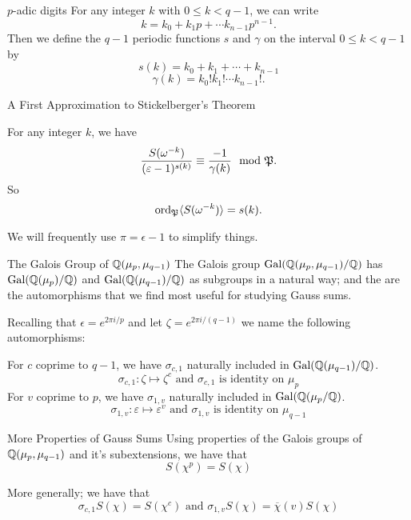 \documentclass[presentation]{beamer}
\begin{document}
\begin{frame}{$p$-adic digits}
For any integer $k$ with $0 \leq k < q-1$, we can write \[k = k_0 + k_1 p + \cdots k_{n-1} p^{n-1}.\]
\pause
\vspace{0.5cm}
Then we define the $q-1$ periodic functions $s$ and $\gamma$ on the interval $0 \leq k < q-1$ by
\[s(k) = k_0 + k_1 + \cdots +k_{n-1} \]
\[\gamma(k) = k_0! k_1! \cdots k_{n-1}!.\]
\end{frame}

\begin{frame}{A First Approximation to Stickelberger's Theorem}
\begin{theorem}
For any integer $k$, we have \[\frac{S(\omega^{-k})}{(\varepsilon - 1)^{s(k)}} \equiv \frac{-1}{\gamma(k)} \mod {\mathfrak{P}}.\]
So \[\textrm{ord}_{\mathfrak{P}} \langle S(\omega^{-k} ) \rangle= s(k).\]
\end{theorem}

We will frequently use $\pi = \epsilon - 1$ to simplify things.
\end{frame}

\begin{frame}{The Galois Group of $\mathbb{Q}(\mu_p, \mu_{q-1})$}
The Galois group $\textrm{Gal}(\mathbb{Q}(\mu_p, \mu_{q-1})/\mathbb{Q})$ has $\textrm{Gal}(\mathbb{Q}(\mu_p)/\mathbb{Q})$ and $\textrm{Gal}(\mathbb{Q}(\mu_{q-1})/\mathbb{Q})$ as subgroups in a natural way; and the are the automorphisms that we find most useful for studying Gauss sums. 

Recalling that $\epsilon = e^{2 \pi i /p}$ and let $\zeta = e^{2 \pi i/ (q-1)}$ we name the following automorphisms:\\
\pause
\vspace{0.5cm}

For $c$ coprime to $q-1$, we have $\sigma_{c,1}$ naturally included in $\textrm{Gal}(\mathbb{Q}(\mu_{q-1})/\mathbb{Q})$.
\[\sigma_{c,1} : \zeta \mapsto \zeta^c \text{ and } \sigma_{c,1} \text{ is identity on } \mu_p\]
\pause
\vspace{0.5cm}
For $v$ coprime to $p$, we have $\sigma_{1,v}$ naturally included in $\textrm{Gal}(\mathbb{Q}(\mu_{p}/\mathbb{Q})$.
\[\sigma_{1,v} : \varepsilon \mapsto \varepsilon^v \text{ and } \sigma_{1,v} \text{ is identity on } \mu_{q-1}\]
\end{frame}

\begin{frame}{More Properties of Gauss Sums }
Using properties of the Galois groups of $\mathbb{Q}(\mu_p, \mu_{q-1})$ and it's subextensions, we have that \[S(\chi^p) = S(\chi)\] 
\pause
\vspace{0.5cm}

More generally; we have that \[\sigma_{c,1}S(\chi) = S(\chi^c) \text{ and } \sigma_{1,v} S(\chi) = \overline{\chi}(v)S(\chi)\]
\end{frame}
\end{document}
